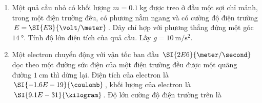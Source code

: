 \begin{enumerate}[label=\bfseries Câu \arabic*:]
\item Một quả cầu nhỏ có khối lượng $m=\SI{0.1}{\kilogram}$ được treo ở đầu một sợi chỉ mảnh, trong một điện trường đều, có phương nằm ngang và có cường độ điện trường $E=\SI{E3}{\volt/\meter}$. Dây chỉ hợp với phương thẳng đứng một góc $\SI{14}{\degree}$. Tính độ lớn điện tích của quả cầu. Lấy $g=\SI{10}{\meter/\second^2}$.

\item Một electron chuyển động với vận tốc ban đầu $\SI{2E6}{\meter/\second}$ dọc theo một đường sức điện của một điện trường đều được một quãng đường $\SI{1}{\centi\meter}$ thì dừng lại. Điện tích của electron là $\SI{-1.6E-19}{\coulomb}$, khối lượng của electron là $\SI{9.1E-31}{\kilogram}$. Độ lớn cường độ điện trường trên là


\end{enumerate}
